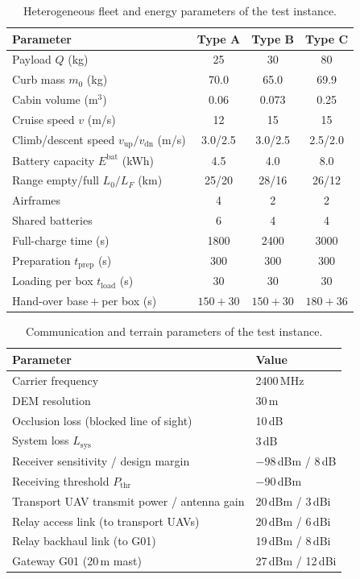 \documentclass[journal]{IEEEtran}
\begin{document}
\begin{table}[t]
\centering
\footnotesize
\setlength{\tabcolsep}{3pt}
\caption{Heterogeneous fleet and energy parameters of the test instance.}
\label{tab:platform}
\begin{tabular}{lccc}
\toprule
Parameter & Type A & Type B & Type C \\
\midrule
Payload $Q$ (kg) & 25 & 30 & 80 \\
Curb mass $m_0$ (kg) & 70.0 & 65.0 & 69.9 \\
Cabin volume (m$^3$) & 0.06 & 0.073 & 0.25 \\
Cruise speed $v$ (m/s) & 12 & 15 & 15 \\
Climb/descent speed $v_{\mathrm{up}}/v_{\mathrm{dn}}$ (m/s) & 3.0/2.5 & 3.0/2.5 & 2.5/2.0 \\
Battery capacity $E^{\mathrm{bat}}$ (kWh) & 4.5 & 4.0 & 8.0 \\
Range empty/full $L_0/L_F$ (km) & 25/20 & 28/16 & 26/12 \\
Airframes & 4 & 2 & 2 \\
Shared batteries & 6 & 4 & 4 \\
Full-charge time (s) & 1800 & 2400 & 3000 \\
Preparation $t_{\mathrm{prep}}$ (s) & 300 & 300 & 300 \\
Loading per box $t_{\mathrm{load}}$ (s) & 30 & 30 & 30 \\
Hand-over base${}+{}$per box (s) & $150{+}30$ & $150{+}30$ & $180{+}36$ \\
\bottomrule
\end{tabular}
\end{table}

\begin{table}[t]
\centering
\footnotesize
\setlength{\tabcolsep}{3pt}
\caption{Communication and terrain parameters of the test instance.}
\label{tab:link}
\begin{tabular}{ll}
\toprule
Parameter & Value \\
\midrule
Carrier frequency & 2400\,MHz \\
DEM resolution & 30\,m \\
Occlusion loss (blocked line of sight) & 10\,dB \\
System loss $L_{\mathrm{sys}}$ & 3\,dB \\
Receiver sensitivity / design margin & $-98$\,dBm / 8\,dB \\
Receiving threshold $P_{\mathrm{thr}}$ & $-90$\,dBm \\
Transport UAV transmit power / antenna gain & 20\,dBm / 3\,dBi \\
Relay access link (to transport UAVs) & 20\,dBm / 6\,dBi \\
Relay backhaul link (to G01) & 19\,dBm / 8\,dBi \\
Gateway G01 (20\,m mast) & 27\,dBm / 12\,dBi \\
\bottomrule
\end{tabular}
\end{table}
\end{document}
